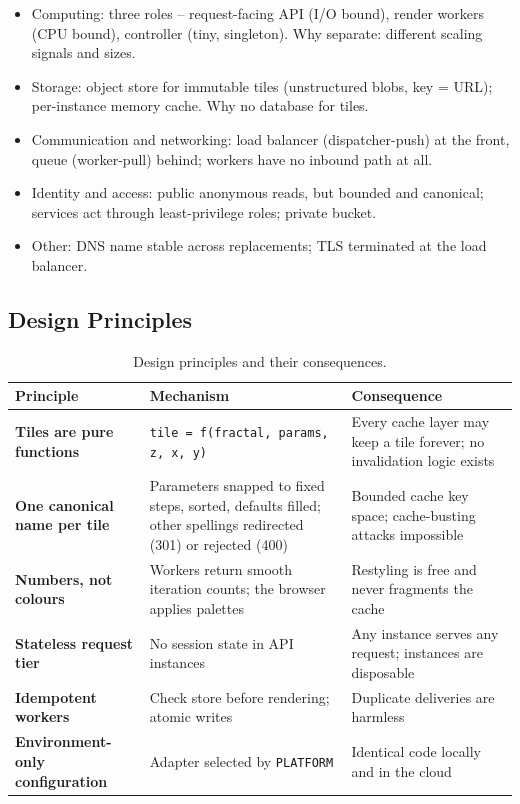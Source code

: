 \documentclass[a4paper,12pt]{article}
\begin{document}
\begin{yourwriting}
\begin{itemize}
    \item Computing: three roles -- request-facing API (I/O bound), render workers (CPU bound), controller (tiny, singleton). Why separate: different scaling signals and sizes.
    \item Storage: object store for immutable tiles (unstructured blobs, key = URL); per-instance memory cache. Why no database for tiles.
    \item Communication and networking: load balancer (dispatcher-push) at the front, queue (worker-pull) behind; workers have no inbound path at all.
    \item Identity and access: public anonymous reads, but bounded and canonical; services act through least-privilege roles; private bucket.
    \item Other: DNS name stable across replacements; TLS terminated at the load balancer.
\end{itemize}
\end{yourwriting}

\subsection{Design Principles}

\begin{table}[H]
\centering
\small
\begin{tabularx}{\linewidth}{>{\bfseries}p{3.6cm} X X}
\toprule
Principle & Mechanism & Consequence \\
\midrule
Tiles are pure functions & \texttt{tile = f(fractal, params, z, x, y)} & Every cache layer may keep a tile forever; no invalidation logic exists \\
One canonical name per tile & Parameters snapped to fixed steps, sorted, defaults filled; other spellings redirected (301) or rejected (400) & Bounded cache key space; cache-busting attacks impossible \\
Numbers, not colours & Workers return smooth iteration counts; the browser applies palettes & Restyling is free and never fragments the cache \\
Stateless request tier & No session state in API instances & Any instance serves any request; instances are disposable \\
Idempotent workers & Check store before rendering; atomic writes & Duplicate deliveries are harmless \\
Environment-only configuration & Adapter selected by \texttt{PLATFORM} & Identical code locally and in the cloud \\
\bottomrule
\end{tabularx}
\caption{Design principles and their consequences.}
\label{tab:principles}
\end{table}
\end{document}
